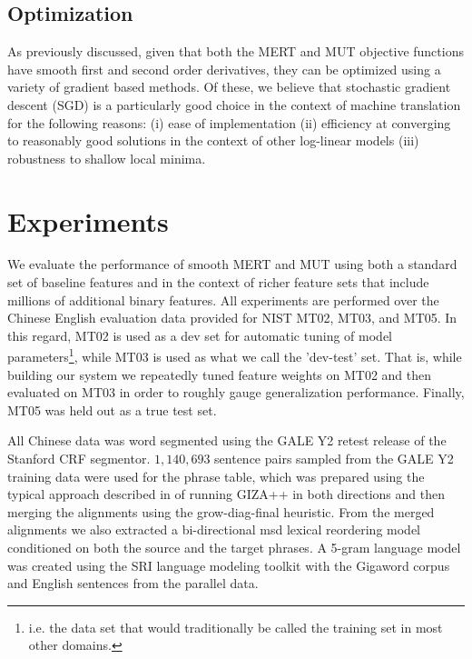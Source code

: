 \documentclass[11pt]{article}
\begin{document}
\subsection{Optimization}

As previously discussed, given that both the MERT and MUT objective functions have smooth first and second order derivatives, they can be optimized using a variety of gradient based methods. Of these, we believe that stochastic gradient descent (SGD) is a particularly good choice in the context of machine translation for the following reasons: (i) ease of implementation (ii) efficiency at converging to reasonably good solutions in the context of other log-linear models \cite{vishwanathan2006} (iii) robustness to shallow local minima. 


\section{Experiments}

We evaluate the performance of smooth MERT and MUT using both a standard set of baseline features and in the context of richer feature sets that include millions of additional binary features. All experiments are performed over the Chinese English evaluation data provided for NIST MT02, MT03, and MT05. In this regard, MT02 is used as a dev set for automatic tuning of model parameters\footnote{i.e. the data set that would traditionally be called the training set in most other domains.}, while MT03 is used as what we call the 'dev-test' set. That is, while building our system we repeatedly tuned feature weights on MT02 and then evaluated on MT03 in order to roughly gauge generalization performance. Finally, MT05 was held out as a true test set.


All Chinese data was word segmented using the GALE Y2 retest release of the Stanford CRF segmentor\cite{tseng2005}. $1,140,693$ sentence pairs sampled from the GALE Y2 training data were used for the phrase table, which was prepared using the typical approach described in \cite{koehn2003} of running GIZA++ \cite{och03} in both directions and then merging the alignments using the grow-diag-final heuristic. From the merged alignments we also extracted a bi-directional msd lexical reordering model conditioned on both the source and the target phrases\cite{koehn2007}. A 5-gram language model was created using the SRI language modeling toolkit \cite{stolcke02srilm} with the Gigaword corpus and English sentences from the parallel data.
 
\end{document}
